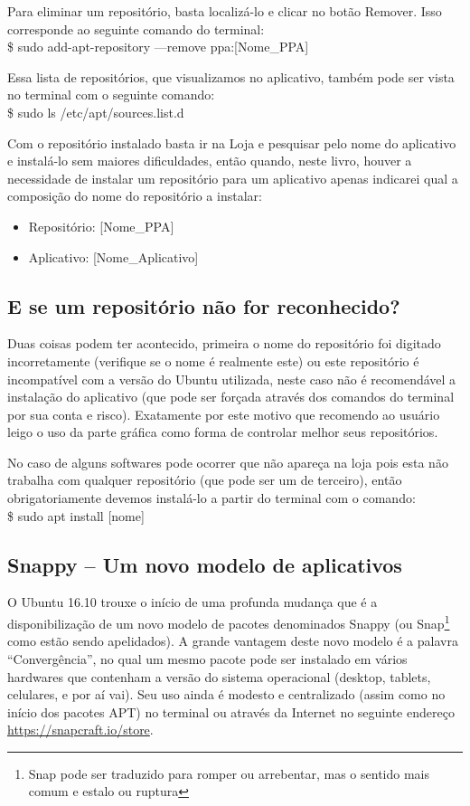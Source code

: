 Para eliminar um repositório, basta localizá-lo e clicar no botão Remover. Isso corresponde ao seguinte comando do terminal: \\
{\ttfamily\$ sudo add-apt-repository ---remove ppa:[Nome\_PPA]}

Essa lista de repositórios, que visualizamos no aplicativo, também pode ser vista no terminal com o seguinte comando: \\
{\ttfamily\$ sudo ls /etc/apt/sources.list.d}

Com o repositório instalado basta ir na Loja e pesquisar pelo nome do aplicativo e instalá-lo sem maiores dificuldades, então quando, neste livro, houver a necessidade de instalar um repositório para um aplicativo apenas indicarei qual a composição do nome do repositório a instalar: \vspace{-1em}
\begin{itemize}[noitemsep]
 \item Repositório: [Nome\_PPA]
 \item Aplicativo: [Nome\_Aplicativo]
\end{itemize}

\subsection{E se um repositório não for reconhecido?}
Duas coisas podem ter acontecido, primeira o nome do repositório foi digitado incorretamente (verifique se o nome é realmente este) ou este repositório é incompatível com a versão do Ubuntu utilizada, neste caso não é recomendável a instalação do aplicativo (que pode ser forçada através dos comandos do terminal por sua conta e risco). Exatamente por este motivo que recomendo ao usuário leigo o uso da parte gráfica como forma de controlar melhor seus repositórios.

No caso de alguns softwares pode ocorrer que não apareça na loja pois esta não trabalha com qualquer repositório (que pode ser um de terceiro), então obrigatoriamente devemos instalá-lo a partir do terminal com o comando: \\
{\ttfamily\$ sudo apt install [nome]}

\subsection{Snappy – Um novo modelo de aplicativos}
O Ubuntu 16.10 trouxe o início de uma profunda mudança que é a disponibilização de um novo modelo de pacotes denominados Snappy (ou Snap\footnote{Snap pode ser traduzido para romper ou arrebentar, mas o sentido mais comum e estalo ou ruptura} como estão sendo apelidados). A grande vantagem deste novo modelo é a palavra ``Convergência'', no qual um mesmo pacote pode ser instalado em vários hardwares que contenham a versão do sistema operacional (desktop, tablets, celulares, e por aí vai). Seu uso ainda é modesto e centralizado (assim como no início dos pacotes APT) no terminal ou através da Internet no seguinte endereço \url{https://snapcraft.io/store}.

